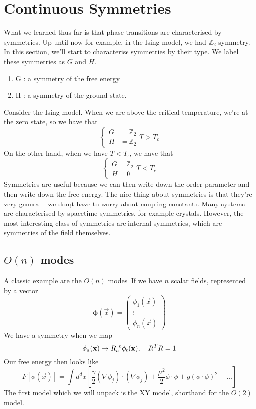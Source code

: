 \section{Continuous Symmetries} 

What we learned thus far is that 
phase transitions are characterised by symmetries. 
Up until now for example, in the Ising model, we had $ \mathbb{ Z}_ 2  $  symmetry. 
In this section, we'll start to characterise symmetries 
by their type. We label these symmetries as $ G $ and $ H $. 
\begin{enumerate}
	\item G : a symmetry of the free energy 
	\item H : a symmetry of the ground state. 
\end{enumerate} 
Consider the Ising model. 
When we are above the critical temperature, we're 
at the zero state, so we have that 
\[
 \begin{cases}
	 G & = \mathbb{ Z} _ 2 \\
	 H & = \mathbb{ Z} _ 2 
 \end{cases}
 T > T _ c 
\] On the other hand, when we 
have $ T < T _ c$, we have that 
\[
 \begin{cases}
	 G = \mathbb{ Z} _ 2 \\
	 H = 0 
 \end{cases}
 T <  T _ c 
\]
Symmetries are useful because we can then write down the order parameter
and then write down the free energy. The nice
thing about symmetries is that they're very general  - we don;t have
to worry about coupling constants. 
Many systems are characterised by spacetime symmetries, for example crystals. 
However, the most interesting class of symmetries 
are internal symmetries, which are symmetries of the field themselves. 

\subsection{$ O ( n ) $ modes} 
A classic example are the 
$ O ( n ) $ modes. If we have $ n $ scalar fields, 
represented by a vector 
\[
	\mathbf{ \phi } ( \vec{x} )  = \begin{pmatrix}  
	\phi _ 1 ( \vec{x} ) \\ \vdots \\ \phi _ n ( \vec{x} )  \end{pmatrix} 
\] We have a symmetry when we map 
\[
	\phi _ a ( \vec{x} ) \to R \indices{_ a ^ b } \phi _ b ( \vec{x} ) , \quad R ^ T  R = 1 
\]  Our free energy then looks like 
\[
	F [ \phi ( \vec{x} ) ] = 
	\int d ^ d x \left[ 
	\frac{ \gamma }{ 2 } ( \nabla \phi _ j ) \cdot  ( \nabla \phi _ j ) +  \frac{\mu ^ 2 }{ 2}
\phi \cdot  \phi + g ( \phi \cdot  \phi ) ^ 2 + \dots \right] 
\] 
The first model which we will unpack is the XY model, shorthand 
for the $ O ( 2) $ model. 


